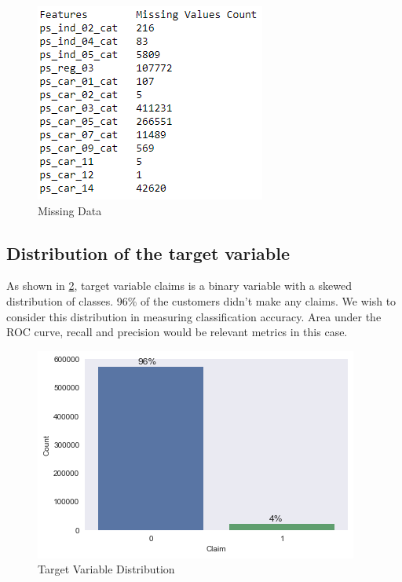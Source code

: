\begin{figure}[!ht]
  \centering\includegraphics[width=\columnwidth]{images/missingdata.PNG}
  \caption{Missing Data}\label{f:missing}
\end{figure}

\subsection{Distribution of the target variable}
As shown in \ref{f:numerical}, target variable claims is a binary variable with a skewed distribution of classes. 96\% of the customers didn't make any claims. We wish to consider this distribution in measuring classification accuracy. Area under the ROC curve, recall and precision would be relevant metrics in this case.
 
\begin{figure}[!ht]
 \centering\includegraphics[width=\columnwidth]{images/target.png}
 \caption{Target Variable Distribution}\label{f:numerical}
\end{figure}

